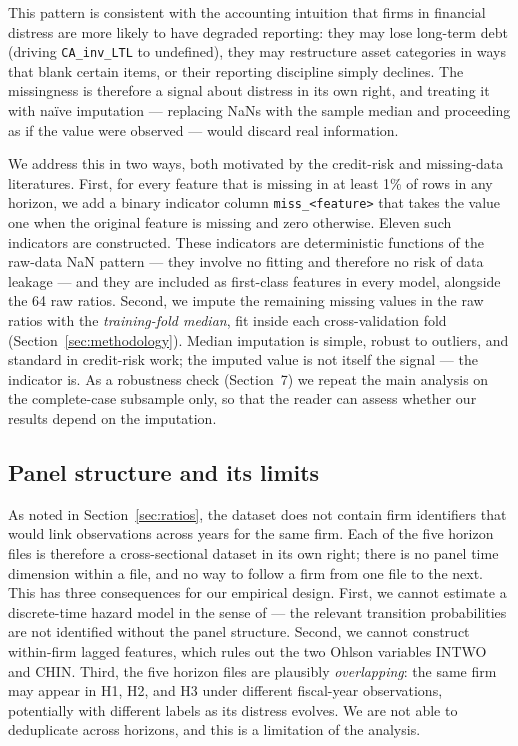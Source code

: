 \documentclass[11pt,a4paper]{article}
\begin{document}
\noindent This pattern is consistent with the accounting intuition that
firms in financial distress are more likely to have degraded reporting: they
may lose long-term debt (driving \texttt{CA\_inv\_LTL} to undefined), they
may restructure asset categories in ways that blank certain items, or their
reporting discipline simply declines. The missingness is therefore a signal
about distress in its own right, and treating it with naïve imputation ---
replacing NaNs with the sample median and proceeding as if the value were
observed --- would discard real information.

We address this in two ways, both motivated by the credit-risk and
missing-data literatures. First, for every feature that is missing in at
least 1\% of rows in any horizon, we add a binary indicator column
\texttt{miss\_<feature>} that takes the value one when the original feature
is missing and zero otherwise. Eleven such indicators are constructed.
These indicators are deterministic functions of the raw-data NaN pattern ---
they involve no fitting and therefore no risk of data leakage --- and they
are included as first-class features in every model, alongside the 64 raw
ratios. Second, we impute the remaining missing values in the raw ratios
with the \textit{training-fold median}, fit inside each cross-validation
fold (Section~\ref{sec:methodology}). Median imputation is simple, robust to
outliers, and standard in credit-risk work; the imputed value is not itself
the signal --- the indicator is. As a robustness check
(Section~7) we repeat the main analysis on the complete-case subsample only,
so that the reader can assess whether our results depend on the imputation.

\subsection{Panel structure and its limits}

As noted in Section~\ref{sec:ratios}, the dataset does not contain firm
identifiers that would link observations across years for the same firm.
Each of the five horizon files is therefore a cross-sectional dataset in its
own right; there is no panel time dimension within a file, and no way to
follow a firm from one file to the next. This has three consequences for our
empirical design. First, we cannot estimate a discrete-time hazard model in
the sense of \cite{shumway2001} --- the relevant transition probabilities are
not identified without the panel structure. Second, we cannot construct
within-firm lagged features, which rules out the two Ohlson variables
INTWO and CHIN. Third, the five horizon files are plausibly
\textit{overlapping}: the same firm may appear in H1, H2, and H3 under
different fiscal-year observations, potentially with different labels as its
distress evolves. We are not able to deduplicate across horizons, and this
is a limitation of the analysis.
\end{document}
